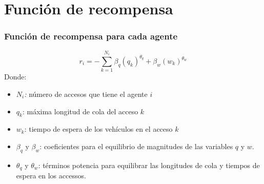 \documentclass[11pt]{beamer}
\begin{document}
\section{Función de recompensa}
\begin{frame}
\frametitle{Función de recompensa para cada agente}
\begin{equation*}\label{eq:rewardQ}
r_i=-\sum_{k=1}^{N_i}\beta_q(q_k)^{\theta_q} + \beta_w(w_k)^{\theta_w}
\end{equation*}
Donde:
\begin{itemize}
\item \textit{$N_i$: } número de accesos que tiene el agente $i$
\item $q_k$: máxima longitud de cola del acceso $k$
\item $w_k$: tiempo de espera de los vehículos en el acceso $k$
\item $\beta_q$ y $\beta_w$: coeficientes para el equilibrio de magnitudes de las variables $q$ y $w$.
\item $\theta_q$ y $\theta_w$: términos potencia para equilibrar las longitudes de cola y tiempos de espera en los accessos.
\end{itemize}
\end{frame}
\end{document}
